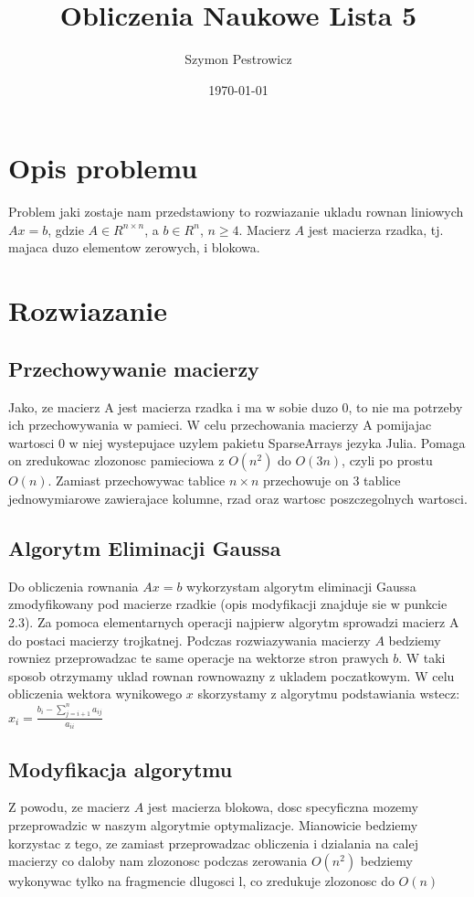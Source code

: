 \documentclass{article}
\title{Obliczenia Naukowe Lista 5} %
\author{Szymon Pestrowicz} %
\date{\today} %
\begin{document}
\maketitle

\section{Opis problemu} %
    Problem jaki zostaje nam przedstawiony to rozwiazanie ukladu rownan liniowych $Ax = b$, gdzie $A\in R^{n\times n}$, a $b\in R^n$, $n\geq 4$. Macierz $A$ jest macierza rzadka, tj. majaca duzo elementow zerowych, i blokowa.

\section{Rozwiazanie}
    \subsection{Przechowywanie macierzy}
        Jako, ze macierz A jest macierza rzadka i ma w sobie duzo 0, to nie ma potrzeby ich przechowywania w pamieci. W celu przechowania macierzy A pomijajac wartosci 0 w niej wystepujace uzylem pakietu SparseArrays jezyka Julia. Pomaga on zredukowac zlozonosc pamieciowa z $O(n^2)$ do $O(3n)$, czyli po prostu $O(n)$. Zamiast przechowywac tablice $n\times n$ przechowuje on 3 tablice jednowymiarowe zawierajace kolumne, rzad oraz wartosc poszczegolnych wartosci.

    \subsection{Algorytm Eliminacji Gaussa}
        Do obliczenia rownania $Ax = b$ wykorzystam algorytm eliminacji Gaussa zmodyfikowany pod macierze rzadkie (opis modyfikacji znajduje sie w punkcie 2.3). Za pomoca elementarnych operacji najpierw algorytm sprowadzi macierz A do postaci macierzy trojkatnej. Podczas rozwiazywania macierzy $A$ bedziemy rowniez przeprowadzac te same operacje na wektorze stron prawych $b$. W taki sposob otrzymamy uklad rownan rownowazny z ukladem poczatkowym. W celu obliczenia wektora wynikowego $x$ skorzystamy z algorytmu podstawiania wstecz: $x_i = \frac{b_i-\sum^{n}_{j=i+1}a_{ij}}{a_{ii}}$

    \subsection{Modyfikacja algorytmu}
        Z powodu, ze macierz $A$ jest macierza blokowa, dosc specyficzna mozemy przeprowadzic w naszym algorytmie optymalizacje. Mianowicie bedziemy korzystac z tego, ze zamiast przeprowadzac obliczenia i dzialania na calej macierzy co daloby nam zlozonosc podczas zerowania $O(n^2)$ bedziemy wykonywac tylko na fragmencie dlugosci l, co zredukuje zlozonosc do $O(n)$
\end{document}
